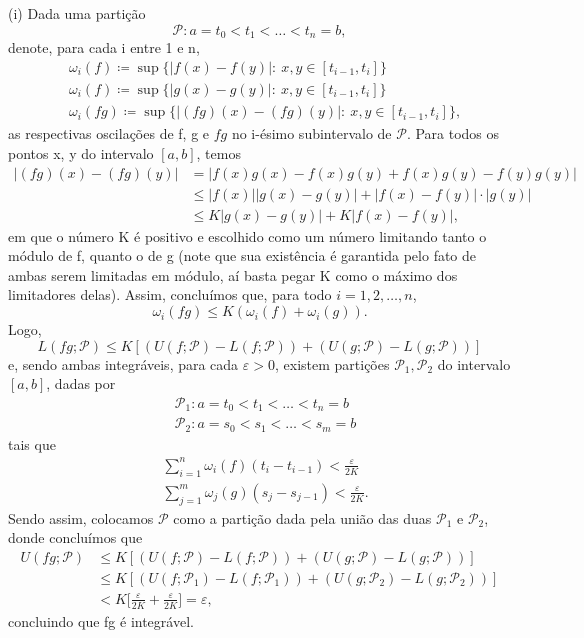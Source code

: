 \documentclass[../analysisII_notes.tex]{subfiles}
\begin{document}
\begin{proof*}
	(i) Dada uma partição
	\[
		\mathcal{P}: a = t_{0} < t_{1} < \dotsc < t_{n} = b,
	\]
	denote, para cada i entre 1 e n,
	\begin{align*}
		 & \omega_{i}(f)\coloneqq \sup_{}\{|f(x)-f(y)|:\:x, y\in [t_{i-1}, t_{i}]\}         \\
		 & \omega_{i}(f)\coloneqq \sup_{}\{|g(x)-g(y)|:\:x, y\in [t_{i-1}, t_{i}]\}         \\
		 & \omega_{i}(fg)\coloneqq \sup_{}\{|(fg)(x)-(fg)(y)|:\:x, y\in [t_{i-1}, t_{i}]\},
	\end{align*}
	as respectivas oscilações de f, g e \(fg\) no i-ésimo subintervalo de \(\mathcal{P}\). Para todos os pontos x, y do intervalo \([a, b]\), temos
	\begin{align*}
		|(fg)(x)-(fg)(y)| & = |f(x)g(x)-f(x)g(y)+f(x)g(y)-f(y)g(y)|        \\
		                  & \leq |f(x)||g(x)-g(y)|+|f(x)-f(y)|\cdot |g(y)| \\
		                  & \leq K|g(x)-g(y)| + K |f(x)-f(y)|,
	\end{align*}
	em que o número K é positivo e escolhido como um número limitando tanto o módulo de f, quanto o de g (note que sua existência é garantida pelo fato de ambas serem limitadas em módulo, aí basta pegar K como o máximo dos limitadores delas). Assim, concluímos que, para todo \(i=1,2,\dotsc ,n\),
	\[
		\omega_{i}(fg)\leq K(\omega_{i}(f)+\omega_{i}(g)).
	\]
	Logo,
	\[
		L(fg; \mathcal{P})\leq K [(U(f; \mathcal{P})-L(f; \mathcal{P})) + (U(g; \mathcal{P})-L(g; \mathcal{P}))]
	\]
	e, sendo ambas integráveis, para cada \(\varepsilon >0\), existem partições \(\mathcal{P}_{1}, \mathcal{P}_{2}\) do intervalo \([a, b]\), dadas por
	\begin{align*}
		 & \mathcal{P}_{1}: a=t_{0}<t_{1}<\dotsc <t_{n}=b   \\
		 & \mathcal{P}_{2}: a = s_{0}<s_{1}<\dotsc <s_{m}=b
	\end{align*}
	tais que
	\begin{align*}
		 & \sum\limits_{i=1}^{n}\omega_{i}(f)(t_{i}-t_{i-1})<\frac{\varepsilon }{2K}  \\
		 & \sum\limits_{j=1}^{m}\omega_{j}(g)(s_{j}-s_{j-1})<\frac{\varepsilon }{2K}.
	\end{align*}
	Sendo assim, colocamos \(\mathcal{P}\) como a partição dada pela união das duas \(\mathcal{P}_{1}\) e \(\mathcal{P}_{2}\), donde concluímos que
	\begin{align*}
		U(fg; \mathcal{P}) & \leq K[(U(f; \mathcal{P})-L(f; \mathcal{P})) + (U(g; \mathcal{P})-L(g; \mathcal{P}))]                 \\
		                   & \leq K[(U(f; \mathcal{P}_{1})-L(f; \mathcal{P}_{1})) + (U(g; \mathcal{P}_{2})-L(g; \mathcal{P}_{2}))] \\
		                   & < K \biggl[\frac{\varepsilon }{2K}+\frac{\varepsilon }{2K}\biggr]=\varepsilon,
	\end{align*}
	concluindo que fg é integrável.


\end{proof*}
\end{document}
